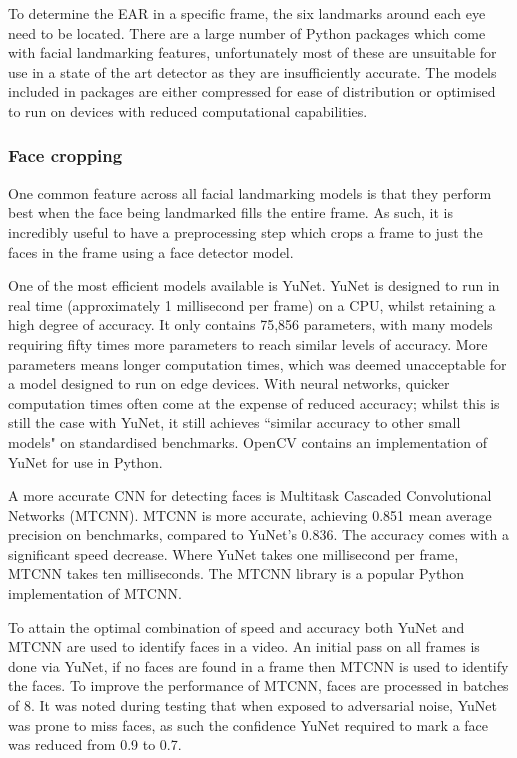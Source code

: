 To determine the EAR in a specific frame, the six landmarks around each eye need to be located. There are a large number of Python packages which come with facial landmarking features, unfortunately most of these are unsuitable for use in a state of the art detector as they are insufficiently accurate. The models included in packages are either compressed for ease of distribution or optimised to run on devices with reduced computational capabilities. 

\subsubsection{Face cropping}

One common feature across all facial landmarking models is that they perform best when the face being landmarked fills the entire frame. As such, it is incredibly useful to have a preprocessing step which crops a frame to just the faces in the frame using a face detector model. 

One of the most efficient models available is YuNet\cite{wu2023yunet}. YuNet is designed to run in real time (approximately 1 millisecond per frame) on a CPU, whilst retaining a high degree of accuracy. It only contains 75,856 parameters, with many models requiring fifty times more parameters to reach similar levels of accuracy. More parameters means longer computation times, which was deemed unacceptable for a model designed to run on edge devices. With neural networks, quicker computation times often come at the expense of reduced accuracy; whilst this is still the case with YuNet, it still achieves ``similar accuracy to other small models" on standardised benchmarks. OpenCV contains an implementation of YuNet for use in Python\cite{yunetpyton}.

A more accurate CNN for detecting faces is Multitask Cascaded Convolutional Networks (MTCNN)\cite{zhang2016joint}. MTCNN is more accurate, achieving 0.851 mean average precision on benchmarks, compared to YuNet's 0.836. The accuracy comes with a significant speed decrease. Where YuNet takes one millisecond per frame, MTCNN takes ten milliseconds. The MTCNN library\cite{centeno2024mtcnn} is a popular Python implementation of MTCNN.

To attain the optimal combination of speed and accuracy both YuNet and MTCNN are used to identify faces in a video. An initial pass on all frames is done via YuNet, if no faces are found in a frame then MTCNN is used to identify the faces. To improve the performance of MTCNN, faces are processed in batches of 8. It was noted during testing that when exposed to adversarial noise, YuNet was prone to miss faces, as such the confidence YuNet required to mark a face was reduced from 0.9 to 0.7.

